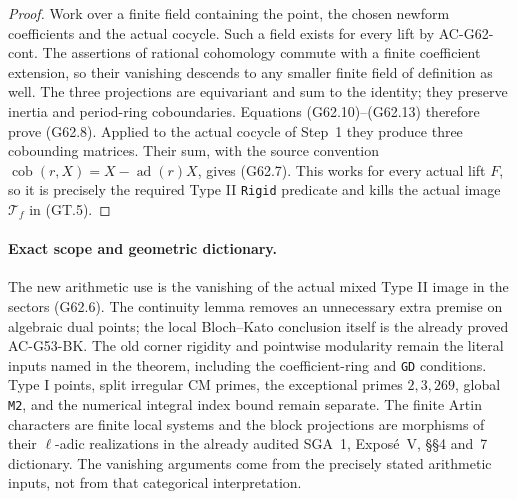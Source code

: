 \begin{proof}
Work over a finite field containing the point,
the chosen newform coefficients and the actual
cocycle.  Such a field exists for every lift
by AC-G62-cont.  The assertions of rational
cohomology commute with a finite coefficient
extension, so their vanishing descends to any
smaller finite field of definition as well.
The three projections are equivariant and
sum to the identity; they preserve inertia
and period-ring coboundaries.  Equations
(G62.10)--(G62.13) therefore prove (G62.8).
Applied to the actual cocycle of Step~1 they
produce three cobounding matrices.  Their
sum, with the source convention
$\operatorname{cob}(r,X)=X-\operatorname{ad}(r)X$,
gives (G62.7).  This works for every actual
lift $F$, so it is precisely the required
Type II \texttt{Rigid} predicate and kills
the actual image $\mathcal T_f$ in (GT.5).
\end{proof}

\paragraph{Exact scope and geometric dictionary.}
The new arithmetic use is the vanishing of the
actual mixed Type II image in the sectors (G62.6).
The continuity lemma removes an unnecessary
extra premise on algebraic dual points; the
local Bloch--Kato conclusion itself is the
already proved AC-G53-BK.  The old corner
rigidity and pointwise modularity remain the
literal inputs named in the theorem, including
the coefficient-ring and \texttt{GD} conditions.
Type I points, split irregular CM primes,
the exceptional primes $2,3,269$, global
\texttt{M2}, and the numerical integral index
bound remain separate.  The finite Artin
characters are finite local systems and the
block projections are morphisms of their
$\ell$-adic realizations in the already
audited SGA~1, Expos\'e~V, \S\S4 and~7
dictionary.  The vanishing arguments come
from the precisely stated arithmetic inputs,
not from that categorical interpretation.

